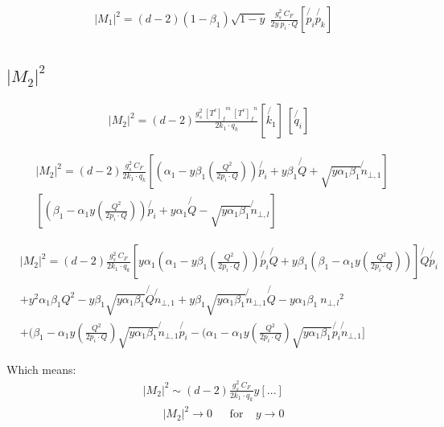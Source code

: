 \begin{equation}
\begin{split}
&|M_1|^2=(d-2)(1-\beta_1)\sqrt{1-y}\:\frac{g_s^2 \: C_F }{2y\: p_i \cdot Q}
[\not{p_i} \not{p_k} ]\\
\end{split}
\end{equation}

\subsection*{$ |M_2|^2 $}

\begin{equation}
\begin{split}
|M_2|^2 =(d-2) \frac{g_s^2 \: {[T^c]_f}^m \: {[T^c]_{f}}^n }{2k_1 \cdot q_k} [\not{k_1}]\: 
[\not{q_i} ]
\end{split}
\end{equation}

\begin{equation}
\begin{split}
&|M_2|^2 =(d-2) \frac{g_s^2 \: C_F}{2k_1 \cdot q_k} [(\alpha_1 -y\beta_1(\frac{Q^2}{2p_i \cdot Q})) \not{p_i} + y\beta_1\not{Q} + \sqrt{y\alpha_1\beta_1}\not{n}_{\bot,1}]\: \\
&[(\beta_1 -\alpha_1 y(\frac{Q^2}{2p_i \cdot Q}))\not{p_i} + y\alpha_1\not{Q} - \sqrt{y\alpha_1\beta_1}\not{n}_{\bot,l} ]
\end{split}
\end{equation}


\begin{equation}
\begin{split}
&|M_2|^2 =(d-2) \frac{g_s^2 \: C_F}{2k_1 \cdot q_k} [y\alpha_1(\alpha_1 -y\beta_1(\frac{Q^2}{2p_i \cdot Q}))\not{p_i}\not{Q}  + y\beta_1(\beta_1 -\alpha_1 y(\frac{Q^2}{2p_i \cdot Q}))]\not{Q}\not{p_i}\\
&+y^2\alpha_1\beta_1 Q^2-y\beta_1\sqrt{y\alpha_1\beta_1}\not{Q}\not{n}_{\bot,1}+y\beta_1\sqrt{y\alpha_1\beta_1}\not{n}_{\bot,1}\not{Q}- y\alpha_1\beta_1 \:{{n}_{\bot,l}}^2 \\
&+ (\beta_1 -\alpha_1 y(\frac{Q^2}{2p_i \cdot Q})\sqrt{y\alpha_1\beta_1}\not{n}_{\bot,1}\not{p_i}- (\alpha_1 -\alpha_1 y(\frac{Q^2}{2p_i \cdot Q})\sqrt{y\alpha_1\beta_1}\not{p_i}\not{n}_{\bot,1} ]
\end{split}
\end{equation}

Which means:
\begin{equation}
\begin{split}
&|M_2|^2 \sim(d-2) \frac{g_s^2 \: C_F}{2k_1 \cdot q_k} y[...]\\
&\:\:\:\:\:\:\:\:|M_2|^2\rightarrow 0 \:\:\:\:\:\:\:\text{for}\:\:\:\:\: y\rightarrow 0
\end{split}
\end{equation}

